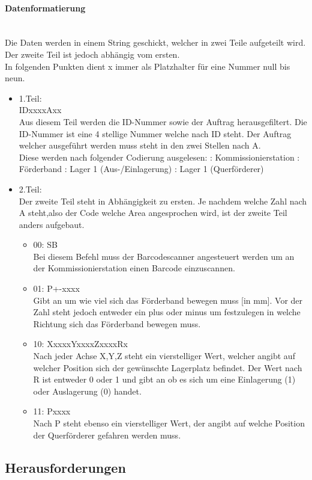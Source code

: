         \paragraph{Datenformatierung}\mbox{}\\
        Die Daten werden in einem String geschickt, welcher in zwei Teile aufgeteilt wird. Der zweite Teil ist jedoch abhängig vom ersten. \\
        In folgenden Punkten dient x immer als Platzhalter für eine Nummer null bis neun. 
        \begin{itemize}
            \item 1.Teil: \\
            IDxxxxAxx  \\
            Aus diesem Teil werden die ID-Nummer sowie der Auftrag herausgefiltert. Die ID-Nummer ist eine 4 stellige Nummer welche nach ID steht. Der Auftrag welcher ausgeführt werden muss steht in den zwei Stellen nach A.\\
            Diese werden nach folgender Codierung ausgelesen:
                : Kommissionierstation
                : Förderband
                : Lager 1 (Aus-/Einlagerung)
                : Lager 1 (Querförderer)
            \item 2.Teil: \\
            Der zweite Teil steht in Abhängigkeit zu ersten. Je nachdem welche Zahl nach A steht,also der Code welche Area angesprochen wird, ist der zweite Teil anders aufgebaut.
                \begin{itemize}
                \item 00: SB\\
                Bei diesem Befehl muss der Barcodescanner angesteuert werden um an der Kommissionierstation einen Barcode einzuscannen.
                \item 01: P+-xxxx \\
                Gibt an um wie viel sich das Förderband bewegen muss [in mm]. Vor der Zahl steht jedoch entweder ein plus oder minus um festzulegen in welche Richtung sich das Förderband bewegen muss. 
                \item 10: XxxxxYxxxxZxxxxRx \\
                Nach jeder Achse X,Y,Z steht ein vierstelliger Wert, welcher angibt auf welcher Position sich der gewünschte Lagerplatz befindet. Der Wert nach R ist entweder 0 oder 1 und gibt an ob es sich um eine Einlagerung (1) oder Auslagerung (0) handet.
                \item 11: Pxxxx \\
                Nach P steht ebenso ein vierstelliger Wert, der angibt auf welche Position der Querförderer gefahren werden muss. 
                
                \end{itemize}
            
        \end{itemize}

\subsection{Herausforderungen}
